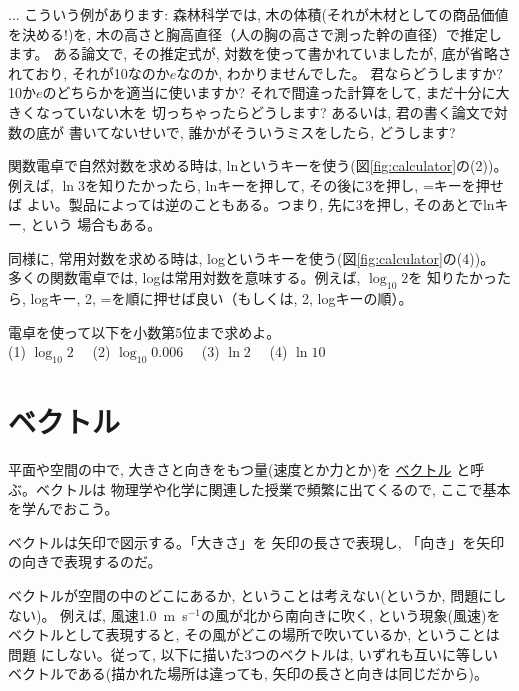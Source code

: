 \begin{faq}{\small{} ... 
こういう例があります: 森林科学では, 木の体積(それが木材としての商品価値を決める!)を, 
木の高さと胸高直径（人の胸の高さで測った幹の直径）で推定します。
ある論文で, その推定式が, 対数を使って書かれていましたが, 
底が省略されており, それが10なのか$e$なのか, わかりませんでした。
君ならどうしますか? 10か$e$のどちらかを適当に使いますか? 
それで間違った計算をして, まだ十分に大きくなっていない木を
切っちゃったらどうします? あるいは, 君の書く論文で対数の底が
書いてないせいで, 誰かがそういうミスをしたら, どうします?
}\end{faq}

関数電卓で自然対数を求める時は, lnというキーを使う(図\ref{fig:calculator}の(2))。
例えば, $\ln 3$を知りたかったら, lnキーを押して, その後に3を押し, =キーを押せば
よい。製品によっては逆のこともある。つまり, 先に3を押し, そのあとでlnキー, という
場合もある。

同様に, 常用対数を求める時は, logというキーを使う(図\ref{fig:calculator}の(4))。
多くの関数電卓では, logは常用対数を意味する。例えば, $\log_{10} 2$を
知りたかったら, logキー, 2, =を順に押せば良い（もしくは, 2, logキーの順）。

\begin{q}\label{q:alg_dentaku_ln} 
電卓を使って以下を小数第5位まで求めよ。\\
(1) $\log_{10} 2$　
(2) $\log_{10} 0.006$　
(3) $\ln 2$　
(4) $\ln 10$
\end{q}
\mv


\section{ベクトル}\label{sect:vector_digest}

平面や空間の中で, 大きさと向きをもつ量(速度とか力とか)を
\underline{ベクトル} と呼ぶ。ベクトルは
物理学や化学に関連した授業で頻繁に出てくるので, ここで基本
を学んでおこう。

ベクトルは矢印で図示する。「大きさ」を
矢印の長さで表現し, 「向き」を矢印の向きで表現するのだ。

ベクトルが空間の中のどこにあるか, ということは考えない(というか, 問題にしない)。
例えば, 風速1.0~m~s$^{-1}$の風が北から南向きに吹く, という現象(風速)を
ベクトルとして表現すると, その風がどこの場所で吹いているか, ということは問題
にしない。従って, 以下に描いた3つのベクトルは, いずれも互いに等しい
ベクトルである(描かれた場所は違っても, 矢印の長さと向きは同じだから)。

